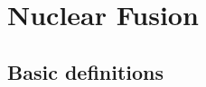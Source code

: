 \documentclass[oneside,a4paper,11pt]{report}
\begin{document}
\chapter{Nuclear Fusion}

\section{Basic definitions}
\end{document}
